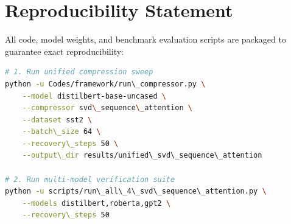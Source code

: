 \section{Reproducibility Statement}
All code, model weights, and benchmark evaluation scripts are packaged to guarantee exact reproducibility:
\begin{lstlisting}[language=bash]
# 1. Run unified compression sweep
python -u Codes/framework/run\_compressor.py \
    --model distilbert-base-uncased \
    --compressor svd\_sequence\_attention \
    --dataset sst2 \
    --batch\_size 64 \
    --recovery\_steps 50 \
    --output\_dir results/unified\_svd\_sequence\_attention

# 2. Run multi-model verification suite
python -u scripts/run\_all\_4\_svd\_sequence\_attention.py \
    --models distilbert,roberta,gpt2 \
    --recovery\_steps 50
\end{lstlisting}
